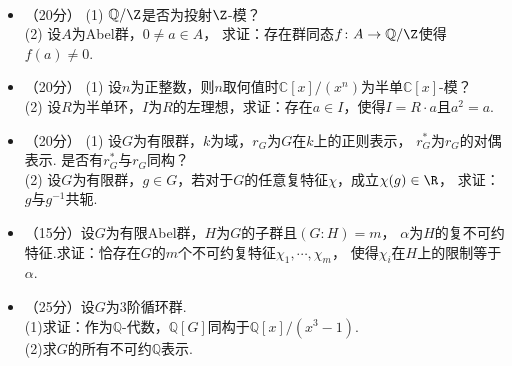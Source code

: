 ~\\
\begin{center}
\end{center}
\begin{itemize}
\item[1.]（20分）
(1) $\mathbb{Q}/\Z$是否为投射$\Z$-模？\\
(2) 设$A$为Abel群，$0\neq a\in A$，
求证：存在群同态$f\colon A\rightarrow\mathbb{Q}/\Z$使得$f(a)\neq0$.

\item[2.]（20分）
(1) 设$n$为正整数，则$n$取何值时$\mathbb{C}[x]/(x^n)$为半单$\mathbb{C}[x]$-模？\\
(2) 设$R$为半单环，$I$为$R$的左理想，求证：存在$a\in I$，使得$I=R\cdot a$且$a^2=a$.

\item[3.]（20分）
(1) 设$G$为有限群，$k$为域，$r_G$为$G$在$k$上的正则表示，
$r^*_G$为$r_G$的对偶表示. 是否有$r^*_G$与$r_G$同构？\\
(2) 设$G$为有限群，$g\in G$，若对于$G$的任意复特征$\chi$，成立$\chi(g)\in\R$，
求证：$g$与$g^{-1}$共轭.

\item[4.]（15分）设$G$为有限Abel群，$H$为$G$的子群且$(G:H)=m$，
$\alpha$为$H$的复不可约特征.求证：恰存在$G$的$m$个不可约复特征$\chi_1,\cdots,\chi_m$，
使得$\chi_i$在$H$上的限制等于$\alpha$.

\item[5.]（25分）设$G$为$3$阶循环群.\\
(1)求证：作为$\mathbb{Q}$-代数，$\mathbb{Q}[G]$同构于$\mathbb{Q}[x]/(x^3-1)$.\\
(2)求$G$的所有不可约$\mathbb{Q}$表示.
\end{itemize}

